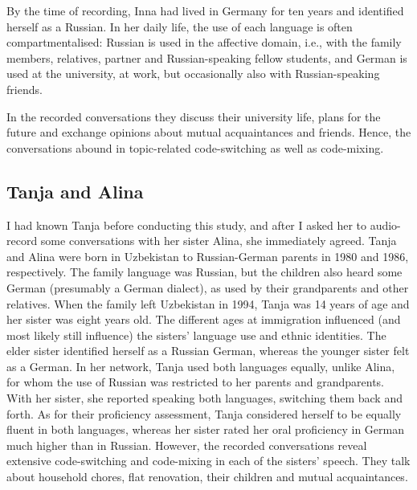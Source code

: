 By the time of recording, Inna had lived in Germany for ten years and identified herself as a Russian. In her daily life, the use of each language is often compartmentalised: Russian is used in the affective domain, i.e., with the family members, relatives, partner and Russian-speaking fellow students, and German is used at the university, at work, but occasionally also with Russian-speaking friends. 

In the recorded conversations they discuss their university life, plans for the future and exchange opinions about mutual acquaintances and friends. Hence, the conversations abound in topic-related code-switching as well as code-mixing.

\subsection{Tanja and Alina}
I had known Tanja before conducting this study, and after I asked her to audio-record some conversations with her sister Alina, she immediately agreed. Tanja and Alina were born in Uzbekistan to Russian-German parents in 1980 and 1986, respectively. The family language was Russian, but the children also heard some German (presumably a German dialect), as used by their grandparents and other relatives. When the family left Uzbekistan in 1994, Tanja was 14 years of age and her sister was eight years old. The different ages at immigration influenced (and most likely still influence) the sisters' language use and ethnic identities. The elder sister identified herself as a Russian German, whereas the younger sister felt as a German. In her network, Tanja used both languages equally, unlike Alina, for whom the use of Russian was restricted to her parents and grandparents. With her sister, she reported speaking both languages, switching them back and forth. As for their proficiency assessment, Tanja considered herself to be equally fluent in both languages, whereas her sister rated her oral proficiency in German much higher than in Russian. However, the recorded conversations reveal extensive code-switching and code-mixing in each of the sisters' speech. They talk about household chores, flat renovation, their children and mutual acquaintances.

